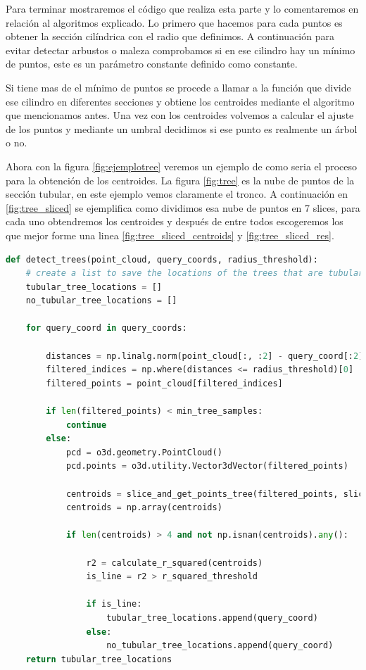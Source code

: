 Para terminar mostraremos el código que realiza esta parte y lo comentaremos en relación al algoritmos explicado. Lo primero que hacemos para cada puntos es obtener la sección cilíndrica con el radio que definimos. A continuación para evitar detectar arbustos o maleza comprobamos si en ese cilindro hay un mínimo de puntos, este es un parámetro constante definido como constante.


Si tiene mas de el mínimo de puntos se procede a llamar a la función que divide ese cilindro en diferentes secciones y obtiene los centroides mediante el algoritmo que mencionamos antes. Una vez con los centroides volvemos a calcular el ajuste de los puntos y mediante un umbral decidimos si ese punto es realmente un árbol o no.

Ahora con la figura \ref{fig:ejemplotree} veremos un ejemplo de como seria el proceso para la obtención de los centroides. La figura \ref{fig:tree} es la nube de puntos de la sección tubular, en este ejemplo vemos claramente el tronco. A continuación en \ref{fig:tree_sliced} se ejemplifica como dividimos esa nube de puntos en 7 slices, para cada uno obtendremos los centroides y después de entre todos escogeremos los que mejor forme una linea \ref{fig:tree_sliced_centroids} y \ref{fig:tree_sliced_res}.




\begin{lstlisting}[language=Python, caption={Código para la busqueda de máximos }, label=lst:detectT]
def detect_trees(point_cloud, query_coords, radius_threshold):
    # create a list to save the locations of the trees that are tubular
    tubular_tree_locations = []
    no_tubular_tree_locations = []

    for query_coord in query_coords:

        distances = np.linalg.norm(point_cloud[:, :2] - query_coord[:2], axis=1)
        filtered_indices = np.where(distances <= radius_threshold)[0]
        filtered_points = point_cloud[filtered_indices]
        
        if len(filtered_points) < min_tree_samples:
            continue
        else:
            pcd = o3d.geometry.PointCloud()
            pcd.points = o3d.utility.Vector3dVector(filtered_points)
            
            centroids = slice_and_get_points_tree(filtered_points, slice_height)
            centroids = np.array(centroids)

            if len(centroids) > 4 and not np.isnan(centroids).any():

                r2 = calculate_r_squared(centroids)
                is_line = r2 > r_squared_threshold

                if is_line:
                    tubular_tree_locations.append(query_coord)
                else:
                    no_tubular_tree_locations.append(query_coord)
    return tubular_tree_locations
\end{lstlisting}

